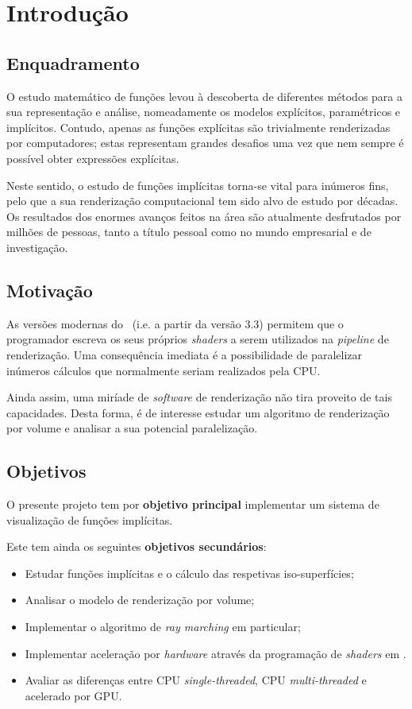 \chapter{Introdução}
\label{ch::intro}

\section{Enquadramento}
\label{sec::intro:enquadramento}

O estudo matemático de funções levou à descoberta de diferentes métodos para a sua representação e análise, nomeadamente os modelos explícitos, paramétricos e implícitos. Contudo, apenas as funções explícitas são trivialmente renderizadas por computadores; estas representam grandes desafios uma vez que nem sempre é possível obter expressões explícitas.

Neste sentido, o estudo de funções implícitas torna-se vital para inúmeros fins, pelo que a sua renderização computacional tem sido alvo de estudo por décadas. Os resultados dos enormes avanços feitos na área são atualmente desfrutados por milhões de pessoas, tanto a título pessoal como no mundo empresarial e de investigação.


\section{Motivação}
\label{sec::intro:motivacao}

As versões modernas do \opengl~(i.e. a partir da versão 3.3) permitem que o programador escreva os seus próprios \textit{shaders} a serem utilizados na \textit{pipeline} de renderização. Uma consequência imediata é a possibilidade de paralelizar inúmeros cálculos que normalmente seriam realizados pela \ac{CPU}.

Ainda assim, uma miríade de \textit{software} de renderização não tira proveito de tais capacidades. Desta forma, é de interesse estudar um algoritmo de renderização por volume e analisar a sua potencial paralelização.


\section{Objetivos}
\label{sec::intro:objetivos}

O presente projeto tem por \textbf{objetivo principal} implementar um sistema de visualização de funções implícitas.

Este tem ainda os seguintes \textbf{objetivos secundários}:
\begin{itemize}
	\item Estudar funções implícitas e o cálculo das respetivas iso-superfícies;
	\item Analisar o modelo de renderização por volume;
	\item Implementar o algoritmo de \textit{ray marching} em particular;
	\item Implementar aceleração por \textit{hardware} através da programação de \emph{shaders} em \opengl.
    \item Avaliar as diferenças entre \ac{CPU} \textit{single-threaded}, \ac{CPU} \textit{multi-threaded} e acelerado por \ac{GPU}.
\end{itemize}


